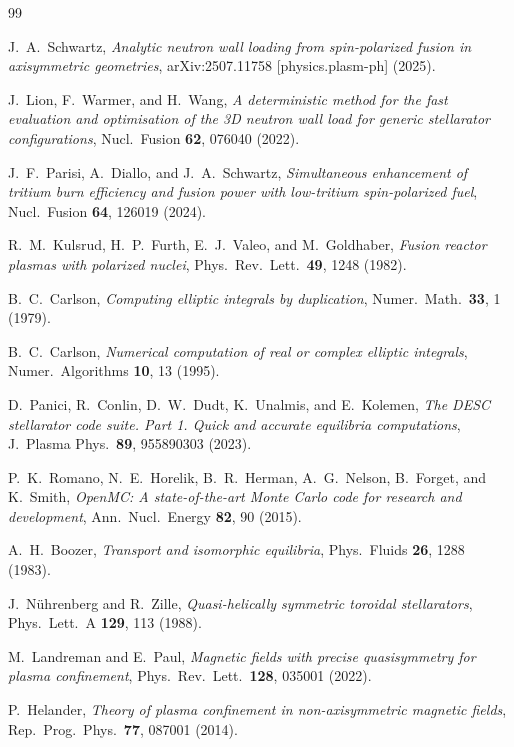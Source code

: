 \documentclass[11pt]{article}
\begin{document}
\begin{thebibliography}{99}

J.~A.~Schwartz,
\emph{Analytic neutron wall loading from spin-polarized fusion in axisymmetric geometries},
arXiv:2507.11758 [physics.plasm-ph] (2025).

J.~Lion, F.~Warmer, and H.~Wang,
\emph{A deterministic method for the fast evaluation and optimisation of the 3D neutron wall load for generic stellarator configurations},
Nucl.\ Fusion \textbf{62}, 076040 (2022).

J.~F.~Parisi, A.~Diallo, and J.~A.~Schwartz,
\emph{Simultaneous enhancement of tritium burn efficiency and fusion power with low-tritium spin-polarized fuel},
Nucl.\ Fusion \textbf{64}, 126019 (2024).

R.~M.~Kulsrud, H.~P.~Furth, E.~J.~Valeo, and M.~Goldhaber,
\emph{Fusion reactor plasmas with polarized nuclei},
Phys.\ Rev.\ Lett.\ \textbf{49}, 1248 (1982).

B.~C.~Carlson,
\emph{Computing elliptic integrals by duplication},
Numer.\ Math.\ \textbf{33}, 1 (1979).

B.~C.~Carlson,
\emph{Numerical computation of real or complex elliptic integrals},
Numer.\ Algorithms \textbf{10}, 13 (1995).

D.~Panici, R.~Conlin, D.~W.~Dudt, K.~Unalmis, and E.~Kolemen,
\emph{The DESC stellarator code suite. Part 1. Quick and accurate equilibria computations},
J.\ Plasma Phys.\ \textbf{89}, 955890303 (2023).

P.~K.~Romano, N.~E.~Horelik, B.~R.~Herman, A.~G.~Nelson, B.~Forget, and K.~Smith,
\emph{OpenMC: A state-of-the-art Monte Carlo code for research and development},
Ann.\ Nucl.\ Energy \textbf{82}, 90 (2015).

A.~H.~Boozer,
\emph{Transport and isomorphic equilibria},
Phys.\ Fluids \textbf{26}, 1288 (1983).

J.~N\"uhrenberg and R.~Zille,
\emph{Quasi-helically symmetric toroidal stellarators},
Phys.\ Lett.\ A \textbf{129}, 113 (1988).

M.~Landreman and E.~Paul,
\emph{Magnetic fields with precise quasisymmetry for plasma confinement},
Phys.\ Rev.\ Lett.\ \textbf{128}, 035001 (2022).

P.~Helander,
\emph{Theory of plasma confinement in non-axisymmetric magnetic fields},
Rep.\ Prog.\ Phys.\ \textbf{77}, 087001 (2014).

\end{thebibliography}
\end{document}
